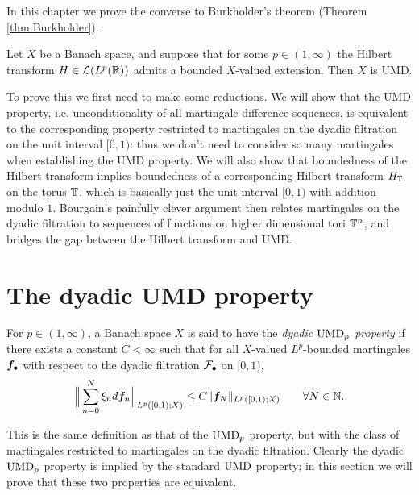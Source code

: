 In this chapter we prove the converse to Burkholder's theorem (Theorem \ref{thm:Burkholder}).

\begin{thm}[Bourgain]\label{thm:Bourgain}
  Let $X$ be a Banach space, and suppose that for some $p \in (1,\infty)$ the Hilbert transform $H \in \mathcal{L}(L^p(\mathbb{R}))$ admits a bounded $X$-valued extension.
  Then $X$ is UMD.
\end{thm}

To prove this we first need to make some reductions.
We will show that the UMD property, i.e. unconditionality of all martingale difference sequences, is equivalent to the corresponding property restricted to martingales on the dyadic filtration on the unit interval $[0,1)$: thus we don't need to consider so many martingales when establishing the UMD property.
We will also show that boundedness of the Hilbert transform implies boundedness of a corresponding Hilbert transform $H_{\mathbb{T}}$ on the torus $\mathbb{T}$, which is basically just the unit interval $[0,1)$ with addition modulo $1$.
Bourgain's painfully clever argument then relates martingales on the dyadic filtration to sequences of functions on higher dimensional tori $\mathbb{T}^{n}$, and bridges the gap between the Hilbert transform and UMD.

\section{The dyadic UMD property}


\begin{defn}
  For $p \in (1,\infty)$, a Banach space $X$ is said to have the \emph{dyadic $\mathrm{UMD}_{p}$ property} if there exists a constant $C < \infty$ such that for all $X$-valued $L^p$-bounded martingales $\bm{f}_{\bullet}$ with respect to the dyadic filtration $\mathcal{F}_{\bullet}$ on $[0,1)$,
  \begin{equation}\label{eq:dyadic-UMD-property}
    \Big\| \sum_{n=0}^{N} \xi_{n} d\bm{f}_{n} \Big\|_{L^p([0,1);X)} \leq C \| \bm{f}_{N}\|_{L^p([0,1);X)} \qquad \forall N \in \mathbb{N}.
  \end{equation}
\end{defn}

This is the same definition as that of the $\mathrm{UMD}_{p}$ property, but with the class of martingales restricted to martingales on the dyadic filtration.
Clearly the dyadic $\mathrm{UMD}_{p}$ property is implied by the standard $\mathrm{UMD}$ property; in this section we will prove that these two properties are equivalent.

